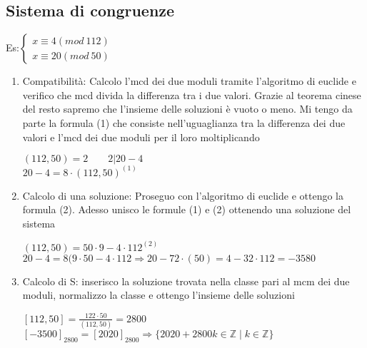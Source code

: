 \documentclass[12pt, a4paper]{article}
\begin{document}
\subsection{Sistema di congruenze}
Es:$\begin{cases}
    x\equiv 4 (mod\ 112)\\
    x\equiv 20 (mod\ 50)
\end{cases}$
\begin{enumerate}
    \item Compatibilità: Calcolo l'mcd dei due moduli tramite l'algoritmo di euclide e 
    verifico che mcd divida la differenza tra i due valori. Grazie al teorema cinese del resto
    sapremo che l'insieme delle soluzioni è vuoto o meno. Mi tengo da parte la formula (1) che
    consiste nell'uguaglianza tra la differenza dei due valori e l'mcd dei due moduli per il loro 
    moltiplicando
    \begin{center}
        $(112,50)=2\qquad 2|20-4$\\
        $20-4=8\cdot(112,50)^{(1)}$
    \end{center}
    \item Calcolo di una soluzione: Proseguo con l'algoritmo di euclide e ottengo la formula (2).
    Adesso unisco le formule (1) e (2) ottenendo una soluzione del sistema
    \begin{center}
        $(112,50)=50\cdot 9 - 4\cdot 112^{(2)}$\\
        $20-4=8(9\cdot 50-4\cdot 112\Rightarrow 20-72\cdot(50)=4-32\cdot 112=-3580$
    \end{center}
    \item Calcolo di S: inserisco la soluzione trovata nella classe pari al mcm dei due moduli,
    normalizzo la classe e ottengo l'insieme delle soluzioni
    \begin{center}
        $[112,50]=\frac{122\cdot 50}{(112,50)}=2800$\\
        $[-3500]_{2800}=[2020]_{2800}\Rightarrow\{2020+2800k\in\mathbb{Z}\mid k\in\mathbb{Z}\}$
    \end{center}
\end{enumerate}
\end{document}
